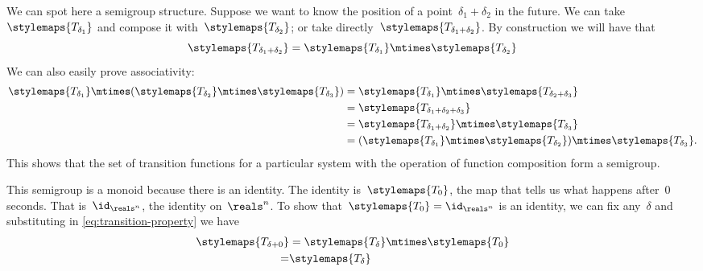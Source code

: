 \begin{example}
    We can spot here a semigroup structure.
    Suppose we want to know the position of a point~$\delta_1 + \delta_2$
    in the future.
    We can take~$\stylemaps{T_{\delta_1}}$ and compose it with~$\stylemaps{T_{\delta_2}}$; or take directly~$\stylemaps{T_{\delta_1 + \delta_2}}$.
    By construction we will have that
    \begin{equation}
        \label{eq:transition-property}
        \stylemaps{T_{\delta_1 + \delta_2}} = \stylemaps{T_{\delta_1}} \mtimes \stylemaps{T_{\delta_2}}
    \end{equation}
    We can also easily prove associativity:
    \begin{equation}
        \begin{aligned}
            \stylemaps{T_{\delta_1}}\mtimes (\stylemaps{T_{\delta_2}}\mtimes \stylemaps{T_{\delta_3}})&=\stylemaps{T_{\delta_1}}\mtimes \stylemaps{T_{\delta_2+\delta_3}}\\
            &=\stylemaps{T_{\delta_1+\delta_2+\delta_3}}\\
            &=\stylemaps{T_{\delta_1+\delta_2}}\mtimes \stylemaps{T_{\delta_3}}\\
            &=(\stylemaps{T_{\delta_1}}\mtimes \stylemaps{T_{\delta_2}})\mtimes \stylemaps{T_{\delta_3}}.
        \end{aligned}
    \end{equation}
%
    This shows that the set of transition functions for a particular system with the operation of function composition form a semigroup.
    
    This semigroup is a monoid because there is an identity.
    The identity is~$\stylemaps{T_0}$, the map that tells us what happens after~$0$ seconds.
    That is~$\id_{\reals^n}$, the identity on~$\reals^n$.
    To show that~$\stylemaps{T_0} = \id_{\reals^n}$ is an identity, we can fix any~$\delta$ and substituting in \cref{eq:transition-property} we have
    \begin{equation*}
        \begin{aligned}
            \stylemaps{T_{\delta + 0}}&= \stylemaps{T_{\delta}} \mtimes \stylemaps{T_{0}} \\
            = & \stylemaps{T_{\delta}}
        \end{aligned}
    \end{equation*}

\end{example}


